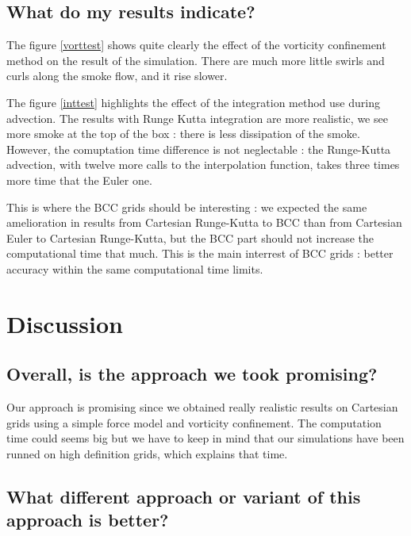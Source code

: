 \documentclass[accepted,single]{gipaper}
\begin{document}
\subsection{What do my results indicate?}

The figure \ref{vorttest} shows quite clearly the effect of the vorticity confinement method on the result of the simulation. There are much more little swirls and curls along the smoke flow, and it rise slower.

The figure \ref{inttest} highlights the effect of the integration method use during advection. The results with Runge Kutta integration are more realistic, we see more smoke at the top of the box : there is less dissipation of the smoke. However, the comuptation time difference is not neglectable : the Runge-Kutta advection, with twelve more calls to the interpolation function, takes three times more time that the Euler one.

This is where the BCC grids should be interesting : we expected the same amelioration in results from Cartesian Runge-Kutta to BCC than from Cartesian Euler to Cartesian Runge-Kutta, but the BCC part should not increase the computational time that much. This is the main interrest of BCC grids : better accuracy within the same computational time limits.


\section{Discussion}

\subsection{Overall, is the approach we took promising?}

Our approach is promising since we obtained really realistic results on Cartesian grids using a simple force model and vorticity confinement. The computation time could seems big but we have to keep in mind that our simulations have been runned on high definition grids, which explains that time.

\subsection{What different approach or variant of this approach is better?}
\end{document}
